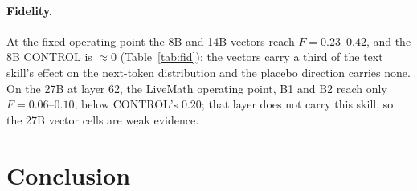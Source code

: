 \documentclass[11pt]{article}
\begin{document}
\begin{table}[t]
\centering\small
{}
\caption{\texttt{livemath\_ts} as text and as three steering vectors (HuggingFace engine, test
splits). Change in points against no skill; $^{*}$ $p<0.05$; bold = survives Holm within the row.
Vectors: difference of means at the last prompt token over the benchmark's 40 train items;
one layer (8B L34, 14B L37, 27B L62), $\gamma=0.3$, fixed in advance.}
\label{tab:cleanvec}
\end{table}

\paragraph{Fidelity.} At the fixed operating point the 8B and 14B vectors reach $F=0.23$--$0.42$, and
the 8B CONTROL is $\approx0$ (Table~\ref{tab:fid}): the vectors carry a third of the text skill's
effect on the next-token distribution and the placebo direction carries none. On the 27B at layer 62,
the LiveMath operating point, B1 and B2 reach only $F=0.06$--$0.10$, below CONTROL's $0.20$; that layer
does not carry this skill, so the 27B vector cells are weak evidence.

\begin{table}[t]
\centering\small
{}
\caption{Fidelity (Eq.~\ref{eq:fidelity}) at $\gamma=0.3$ on 16 dev items; each vector is measured
from the base it was extracted against.}
\label{tab:fid}
\end{table}

\section{Conclusion}
\end{document}
